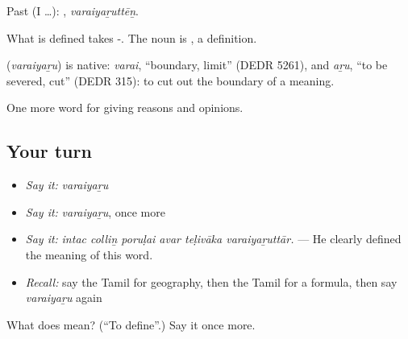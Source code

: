 Past (I …): , \emph{varaiyaṟuttēṉ}.

What is defined takes -. The noun is , a definition.

\begin{cousinweb}
\textbf{} (\emph{varaiyaṟu}) is native: \emph{varai}, \textquotedblleft{}boundary, limit\textquotedblright{} (DEDR 5261), and \emph{aṟu}, \textquotedblleft{}to be severed, cut\textquotedblright{} (DEDR 315): to cut out the boundary of a meaning.
\end{cousinweb}

\begin{grammarlens}[title={What you've built}]
One more word for giving reasons and opinions.
\end{grammarlens}

\subsection*{Your turn}
\begin{itemize}
\raggedright
  \item \emph{Say it:} \emph{varaiyaṟu}
  \item \emph{Say it:} \emph{varaiyaṟu}, once more
  \item \emph{Say it:} \emph{intac colliṉ poruḷai avar teḷivāka varaiyaṟuttār.} — He clearly defined the meaning of this word.
  \item \emph{Recall:} say the Tamil for geography, then the Tamil for a formula, then say \emph{varaiyaṟu} again
\end{itemize}

\begin{tcolorbox}[breakable,colback=teal!4,colframe=teal!35!black,title={Before you move on}]
What does  mean? (\textquotedblleft{}To define\textquotedblright{}.) Say it once more.
\end{tcolorbox}
